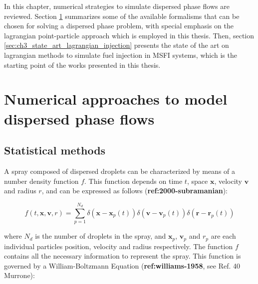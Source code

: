 In this chapter, numerical strategies to simulate dispersed phase flows are reviewed. Section \ref{sec:ch3_numerical_approaches_dispersed_phase} summarizes some of the available formalisms that can be chosen for solving a dispersed phase problem, with special emphasis on the lagrangian point-particle approach which is employed in this thesis. Then, section \ref{sec:ch3_state_art_lagrangian_injection} presents the state of the art on lagrangian methods to simulate fuel injection in MSFI systems, which is the starting point of the works presented in this thesis.

\section{Numerical approaches to model dispersed phase flows}
\label{sec:ch3_numerical_approaches_dispersed_phase}





\subsection{Statistical methods}

A spray composed of dispersed droplets can be characterized by means of a number density function $f$. This function depends on time $t$, space $\textbf{x}$, velocity $\textbf{v}$ and radius $r$, and can be expressed as follows (\textbf{ref:2000-subramanian}):

\begin{equation}
f \left( t, \textbf{x}, \textbf{v}, r \right) = \sum_{p=1}^{N_d} \delta \left( \textbf{x} - \textbf{x}_p \left( t \right) \right)  \delta \left( \textbf{v} - \textbf{v}_p \left( t \right) \right) \delta \left( \textbf{r} - \textbf{r}_p \left( t \right) \right)
\end{equation}

where $N_d$ is the number of droplets in the spray, and $\textbf{x}_p$, $\textbf{v}_p$ and $r_p$ are each individual particles position, velocity and radius respectively. The function $f$ contains all the necessary information to represent the spray. This function is governed by a William-Boltzmann Equation (\textbf{ref:williams-1958}, see Ref. 40 Murrone):

